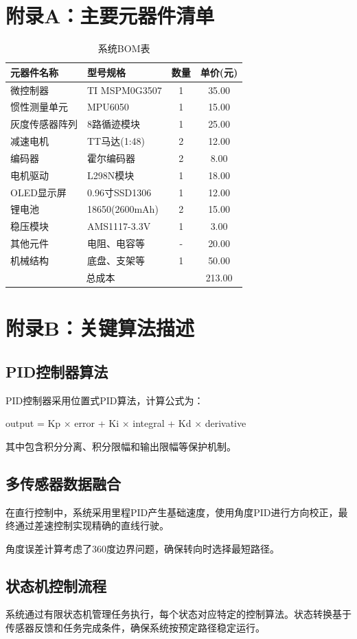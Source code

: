 \documentclass[UTF8]{ctexart}
\begin{document}
\appendix

\section{附录A：主要元器件清单}

\begin{table}[H]
    \centering
    \caption{系统BOM表}
    \label{tab:bom_list}
    \begin{tabular}{llcc}
        \toprule
        元器件名称 & 型号规格 & 数量 & 单价(元) \\
        \midrule
        微控制器 & TI MSPM0G3507 & 1 & 35.00 \\
        惯性测量单元 & MPU6050 & 1 & 15.00 \\
        灰度传感器阵列 & 8路循迹模块 & 1 & 25.00 \\
        减速电机 & TT马达(1:48) & 2 & 12.00 \\
        编码器 & 霍尔编码器 & 2 & 8.00 \\
        电机驱动 & L298N模块 & 1 & 18.00 \\
        OLED显示屏 & 0.96寸SSD1306 & 1 & 12.00 \\
        锂电池 & 18650(2600mAh) & 2 & 15.00 \\
        稳压模块 & AMS1117-3.3V & 1 & 3.00 \\
        其他元件 & 电阻、电容等 & - & 20.00 \\
        机械结构 & 底盘、支架等 & 1 & 50.00 \\
        \midrule
        \multicolumn{3}{c}{总成本} & 213.00 \\
        \bottomrule
    \end{tabular}
\end{table}

\section{附录B：关键算法描述}

\subsection{PID控制器算法}

PID控制器采用位置式PID算法，计算公式为：

output = Kp × error + Ki × integral + Kd × derivative

其中包含积分分离、积分限幅和输出限幅等保护机制。

\subsection{多传感器数据融合}

在直行控制中，系统采用里程PID产生基础速度，使用角度PID进行方向校正，最终通过差速控制实现精确的直线行驶。

角度误差计算考虑了360度边界问题，确保转向时选择最短路径。

\subsection{状态机控制流程}

系统通过有限状态机管理任务执行，每个状态对应特定的控制算法。状态转换基于传感器反馈和任务完成条件，确保系统按预定路径稳定运行。
\end{document}
